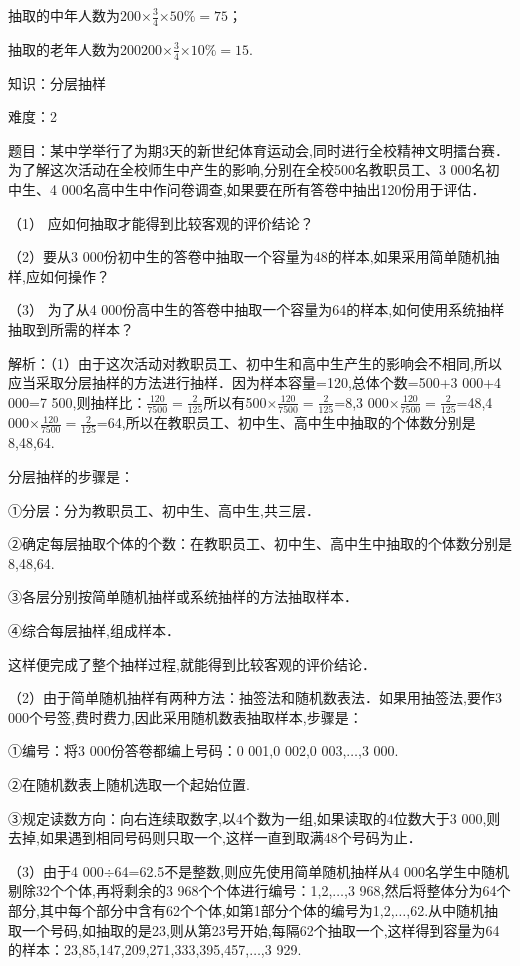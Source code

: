 \documentclass{article} %
\begin{document}
抽取的中年人数为$200\mathrm{\times}\frac{3}{4}\mathrm{\times}50\%=75$；

抽取的老年人数为200$200\mathrm{\times}\frac{3}{4}\mathrm{\times}10\%=15$.

知识：分层抽样

难度：2

题目：某中学举行了为期3天的新世纪体育运动会,同时进行全校精神文明擂台赛．为了解这次活动在全校师生中产生的影响,分别在全校500名教职员工、3 000名初中生、4 000名高中生中作问卷调查,如果要在所有答卷中抽出120份用于评估．

（1） 应如何抽取才能得到比较客观的评价结论？

（2）要从3 000份初中生的答卷中抽取一个容量为48的样本,如果采用简单随机抽样,应如何操作？

（3） 为了从4 000份高中生的答卷中抽取一个容量为64的样本,如何使用系统抽样抽取到所需的样本？

解析：（1）由于这次活动对教职员工、初中生和高中生产生的影响会不相同,所以应当采取分层抽样的方法进行抽样．因为样本容量=120,总体个数=500+3 000+4 000=7 500,则抽样比：$\frac{120}{7500}=\frac{2}{125}$所以有500$\mathrm{\times}\frac{120}{7500}=\frac{2}{125}$=8,3 000$\mathrm{\times}\frac{120}{7500}=\frac{2}{125}$=48,4 000$\mathrm{\times}\frac{120}{7500}=\frac{2}{125}$=64,所以在教职员工、初中生、高中生中抽取的个体数分别是8,48,64.

分层抽样的步骤是：

①分层：分为教职员工、初中生、高中生,共三层．

②确定每层抽取个体的个数：在教职员工、初中生、高中生中抽取的个体数分别是8,48,64.

③各层分别按简单随机抽样或系统抽样的方法抽取样本．

④综合每层抽样,组成样本．

这样便完成了整个抽样过程,就能得到比较客观的评价结论．

（2）由于简单随机抽样有两种方法：抽签法和随机数表法．如果用抽签法,要作3 000个号签,费时费力,因此采用随机数表抽取样本,步骤是：

①编号：将3 000份答卷都编上号码：0 001,0 002,0 003,$\dots$,3 000.

②在随机数表上随机选取一个起始位置.    

③规定读数方向：向右连续取数字,以4个数为一组,如果读取的4位数大于3 000,则去掉,如果遇到相同号码则只取一个,这样一直到取满48个号码为止．

（3）由于4 000$\mathrm{\div}$64=62.5不是整数,则应先使用简单随机抽样从4 000名学生中随机剔除32个个体,再将剩余的3 968个个体进行编号：1,2,$\dots$,3 968,然后将整体分为64个部分,其中每个部分中含有62个个体,如第1部分个体的编号为1,2,$\dots$,62.从中随机抽取一个号码,如抽取的是23,则从第23号开始,每隔62个抽取一个,这样得到容量为64的样本：23,85,147,209,271,333,395,457,$\dots$,3 929.
\end{document}
